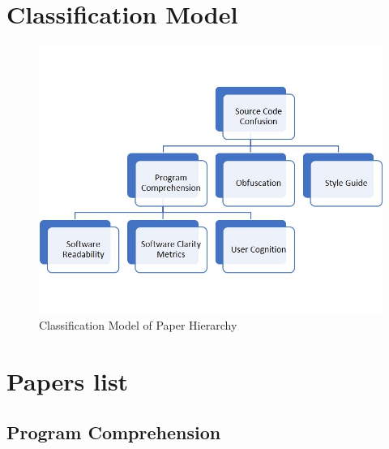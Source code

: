 \documentclass[a4paper, 10pt]{IEEEtran}
\begin{document}
\newpage
\section{Classification Model}
\begin{figure}[ht!]
\centering
\includegraphics[scale=0.45]{Classification_Model}
\caption{Classification Model of Paper Hierarchy}
\label{fig:Classification}
\end{figure}

\section{Papers list}

\subsection{Program Comprehension}
\end{document}
